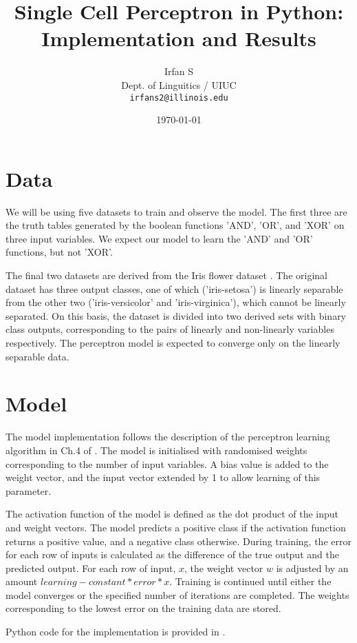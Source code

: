 \documentclass[11pt,a4paper]{article}
\author{Irfan S \\ Dept. of Linguitics / UIUC \\ {\tt irfans2@illinois.edu}}
\date{\today}
\title{Single Cell Perceptron in Python: Implementation and Results}
\begin{document}
\maketitle

\section{Data}
\label{sec:orge7f12f1}
We will be using five datasets to train and observe the model. The first three are the truth tables generated by the boolean functions 'AND', 'OR', and 'XOR' on three input variables. We expect our model to learn the 'AND' and 'OR' functions, but not 'XOR'.

The final two datasets are derived from the Iris flower dataset \citep{Lichman:2013} . The original dataset has three output classes, one of which ('iris-setosa') is linearly separable from the other two ('iris-versicolor' and 'iris-virginica'), which cannot be linearly separated. On this basis, the dataset is divided into two derived sets with binary class outputs, corresponding to the pairs of linearly and non-linearly variables respectively. The perceptron model is expected to converge only on the linearly separable data.


\section{Model}
\label{sec:org50561b5}
The model implementation follows the description of the perceptron learning algorithm in Ch.4 of \citet{rojas-1996}. The model is initialised with randomised weights corresponding to the number of input variables. A bias value is added to the weight vector, and the input vector extended by 1 to allow learning of this parameter.

The activation function of the model is defined as the dot product of the input and weight vectors. The model predicts a positive class if the activation function returns a positive value, and a negative class otherwise. During training, the error for each row of inputs is calculated as the difference of the true output and the predicted output. For each row of input, \(x\), the weight vector \(w\) is adjusted by an amount \(learning-constant * error * x\). Training is continued until either the model converges or the specified number of iterations are completed. The weights corresponding to the lowest error on the training data are stored.

Python code for the implementation is provided in .
\end{document}
